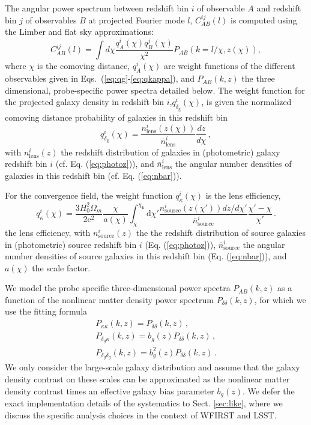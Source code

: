 \documentclass[fleqn,usenatbib,useAMS]{mnras}
\newcommand{\bea}{\begin{eqnarray}}
\newcommand{\eea}{\end{eqnarray}}
\newcommand{\mr}{\mathrm}
\begin{document}
The angular power spectrum between redshift bin $i$ of observable $A$ and redshift bin $j$ of observables $B$ at projected Fourier mode $l$, $C_{AB}^{ij}(l)$ is computed using the Limber and flat sky approximations:
\begin{equation}
\label{eq:projected}
C_{AB}^{ij}(l) = \int d\chi \frac{q_A^i(\chi)q_B^j(\chi)}{\chi^2}P_{AB}(k=l/\chi,z(\chi)),
\end{equation}
where $\chi$ is the comoving distance, $q_A^i(\chi)$ are weight functions of the different observables 
given in Eqs.~(\ref{eq:qg}-\ref{eq:qkappa}), and $P_{AB}(k,z)$ the three dimensional, probe-specific power spectra detailed below. 
The weight function for the projected galaxy density in redshift bin $i$,$q_{\delta_{\mathrm{g}}}^i(\chi)$, is given the normalized comoving distance probability of galaxies in this redshift bin
\begin{equation}
\label{eq:qg}
q_{\delta_{\mathrm{g}}}^i(\chi) =\frac{n_{\mathrm{lens}}^i(z(\chi)) }{\bar{n}_{\mathrm{lens}}^i}\frac{dz}{d\chi}\,,
\end{equation}
with $n_{\mathrm{lens}}^i(z)$ the redshift distribution of galaxies in (photometric) galaxy redshift bin $i$ (cf. Eq. (\ref{eq:photoz})), and $\bar{n}_{\mathrm{lens}}^i$ the angular number densities of galaxies in this redshift bin (cf. Eq. (\ref{eq:nbar})). 

For the convergence field, the weight function $q_\kappa^{i}(\chi)$ is the lens efficiency, 
\begin{equation}
\label{eq:qkappa}
q_\kappa^{i}(\chi) = \frac{3 H_0^2 \Omega_m }{2 \mathrm{c}^2}\frac{\chi}{a(\chi)}\int_\chi^{\chi_{\mr h}} \mr d \chi' \frac{n_{\mathrm{source}}^{i} (z(\chi')) dz/d\chi'}{\bar{n}_{\mathrm{source}}^{i}} \frac{\chi'-\chi}{\chi'} \,.
\end{equation}
the lens efficiency, with $n_{\mathrm{source}}^{i} (z)$ the the redshift distribution of source galaxies in (photometric) source redshift bin $i$ (Eq. (\ref{eq:photoz})), $\bar{n}_{\mathrm{source}}^i$ the angular number densities of source galaxies in this redshift bin (Eq. (\ref{eq:nbar})), and $a(\chi)$ the scale factor.

We model the probe specific three-dimensional power spectra $P_{AB}(k,z)$ as a function of the nonlinear matter density power spectrum $P_{\delta\delta}(k,z)$, for which we use the \citet{tsn12} fitting formula
\bea
P_{\kappa \kappa}(k,z) = P_{\delta\delta}(k,z) \,, \\
P_{\delta_g \kappa}(k,z) = b_g(z) P_{\delta\delta}(k,z) \,, \\
P_{\delta_g \delta_g}(k,z) = b^2_g(z) P_{\delta\delta}(k,z) \,.
\eea
We only consider the large-scale galaxy distribution and assume that the galaxy density contrast on these scales can be approximated as the nonlinear matter density contrast times an effective galaxy bias parameter $b_g(z)$.
We defer the exact implementation details of the systematics to Sect. \ref{sec:like}, where we discuss the specific analysis choices in the context of WFIRST and LSST.
\end{document}
